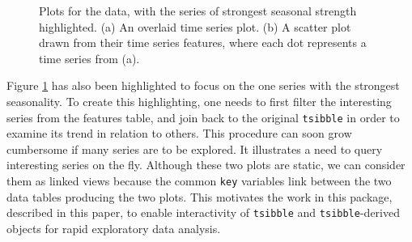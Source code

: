 \begin{figure}

{\centering {}

}

\caption{Plots for the  data, with the series of strongest seasonal strength highlighted. (a) An overlaid time series plot. (b) A scatter plot drawn from their time series features, where each dot represents a time series from (a).}\label{fig:highlight-retail}
\end{figure}

Figure \ref{fig:highlight-retail} has also been highlighted to focus on the one series with the strongest seasonality. To create this highlighting, one needs to first filter the interesting series from the features table, and join back to the original \texttt{tsibble} in order to examine its trend in relation to others. This procedure can soon grow cumbersome if many series are to be explored. It illustrates a need to query interesting series on the fly. Although these two plots are static, we can consider them as linked views because the common \texttt{key} variables link between the two data tables producing the two plots. This motivates the work in this package, described in this paper, to enable interactivity of \texttt{tsibble} and \texttt{tsibble}-derived objects for rapid exploratory data analysis.

